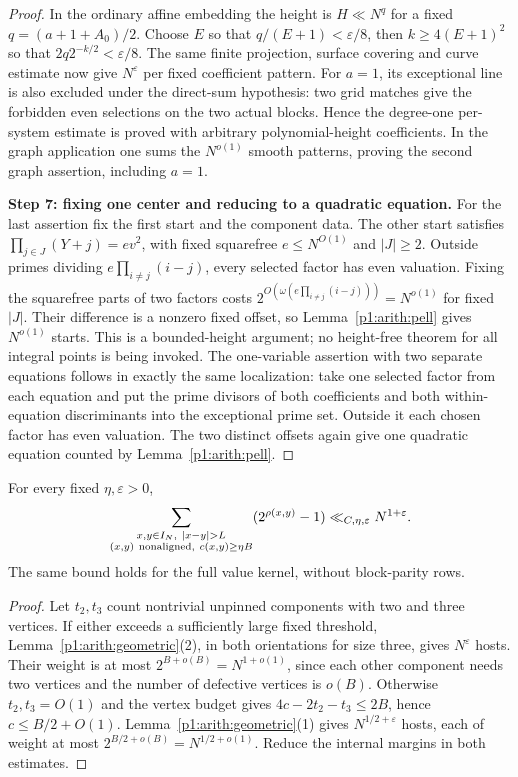\begin{proof}
In the ordinary affine embedding the height is $H\ll N^q$ for a fixed
$q=(a+1+A_0)/2$.  Choose $E$ so that $q/(E+1)<\varepsilon/8$, then
$k\geq4(E+1)^2$ so that $2q2^{-k/2}<\varepsilon/8$.
The same finite projection, surface covering and curve estimate now give
$N^\varepsilon$ per fixed coefficient pattern.  For $a=1$, its exceptional
line is also excluded under the direct-sum hypothesis: two grid matches
give the forbidden even selections on the two actual blocks.  Hence the
degree-one per-system estimate is proved with arbitrary polynomial-height
coefficients.  In the graph application one sums the $N^{o(1)}$ smooth
patterns, proving the second graph assertion, including $a=1$.

\medskip\noindent
\textbf{Step 7: fixing one center and reducing to a quadratic equation.}
For the last assertion fix the first start and the component data.  The
other start satisfies $\prod_{j\in J}(Y+j)=ev^2$, with fixed squarefree
$e\leq N^{O(1)}$ and $|J|\geq2$.  Outside primes dividing
$e\prod_{i\ne j}(i-j)$, every selected factor has even valuation.
Fixing the squarefree parts of two factors costs
$2^{O(\omega(e\prod_{i\ne j}(i-j)))}=N^{o(1)}$ for fixed $|J|$.
Their difference is a nonzero fixed offset, so
Lemma~\ref{p1:arith:pell} gives $N^{o(1)}$ starts.  This is a
bounded-height argument; no height-free theorem for all integral points
is being invoked.
The one-variable assertion with two separate equations follows in exactly
the same localization: take one selected factor from each equation and
put the prime divisors of both coefficients and both within-equation
discriminants into the exceptional prime set.  Outside it each chosen
factor has even valuation.  The two distinct offsets again give one
quadratic equation counted by Lemma~\ref{p1:arith:pell}.
\end{proof}

\begin{lemma}\label{p1:arith:dense}
For every fixed $\eta,\varepsilon>0$,
\[
 \sum_{\substack{x,y\in I_N,\ |x-y|>L\\
        (x,y)\ {\rm nonaligned},\ c(x,y)\geq\eta B}}
       (2^{\rho(x,y)}-1)
 \ll_{C,\eta,\varepsilon}N^{1+\varepsilon}.
\]
The same bound holds for the full value kernel, without block-parity rows.
\end{lemma}

\begin{proof}
Let $t_2,t_3$ count nontrivial unpinned components with two and three
vertices.  If either exceeds a sufficiently large fixed threshold,
Lemma~\ref{p1:arith:geometric}(2), in both orientations for size three,
gives $N^\varepsilon$ hosts.  Their weight is at most
$2^{B+o(B)}=N^{1+o(1)}$, since each other component needs two vertices
and the number of defective vertices is $o(B)$.
Otherwise $t_2,t_3=O(1)$ and the vertex budget gives
$4c-2t_2-t_3\leq2B$, hence $c\leq B/2+O(1)$.
Lemma~\ref{p1:arith:geometric}(1) gives $N^{1/2+\varepsilon}$ hosts,
each of weight at most $2^{B/2+o(B)}=N^{1/2+o(1)}$.
Reduce the internal margins in both estimates.
\end{proof}

